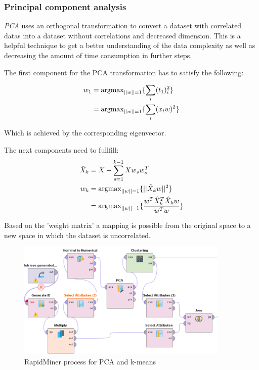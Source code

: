 \subsubsection{Principal component analysis}

\textit{PCA} uses an orthogonal transformation to convert a dataset with correlated datas into a dataset without correlations and decreased dimension. This is a helpful technique to get a better understanding of the data complexity as well as decreasing the amount of time consumption in further steps.

The first component for the PCA transformation has to satisfy the following:

\vspace*{-1em}
\begin{align*}
w_1 &= \text{argmax}_{||w|| = 1} \{\sum_i (t_1)_i^2\}\\
	&= \text{argmax}_{||w|| = 1} \{\sum_i (x_iw)^2\}
	\vspace*{-2em}
\end{align*}


Which is achieved by the corresponding eigenvector.

The next components need to fullfill:
\begin{align*}
\hat{X}_k &= X - \sum_{s=1}^{k-1} Xw_sw_s^T\\
w_k &= \text{argmax}_{||w|| = 1} \{||\hat{X}_kw||^2\}\\
	&= \text{argmax}_{||w|| = 1} \{\frac{w^T\hat{X}_k^T\hat{X}_kw}{w^Tw}\}
	\vspace*{-1em}
\end{align*}

Based on the 'weight matrix' a mapping is possible from the original space to a new space in which the dataset is uncorrelated. 
	
	\vspace*{-1em}
	\begin{figure}[H]
	\centering
	\includegraphics[width=0.9\textwidth]{PCAClustering}
	\caption{RapidMiner process for PCA and k-means}
	\label{fig:PCA}
	\vspace*{-2em}
	\end{figure}

